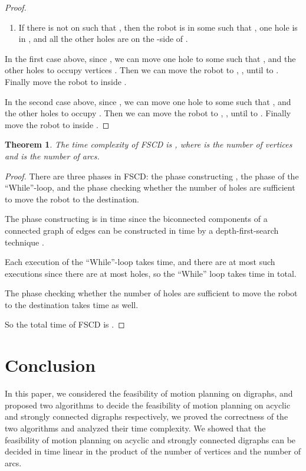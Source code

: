 \documentclass{article}
\newtheorem{thm}{Theorem}
\begin{document}
\begin{proof}
\begin{enumerate}
\item If there is  not on  such that
, then the robot is in some  such that
, one hole is in , and all
the other holes are on the -side of .
\end{enumerate}

In the first case above, since , we can move one hole
to some  such that , and the other holes to
occupy vertices . Then we can move the robot
to , , until to . Finally move the robot to
 inside .

In the second case above, since , we can move one
hole to some  such that , and the other
holes to occupy . Then we can move the robot to
, , until to . Finally move the robot to 
inside .

\end{proof}

\begin{thm}\label{thm:strong-complexity}
The time complexity of FSCD is , where  is the number of
vertices and  is the number of arcs.
\end{thm}
\begin{proof}

There are three phases in FSCD: the phase constructing
, the phase of the ``While''-loop, and the
phase checking whether the number of holes are sufficient to move
the robot to the destination.

The phase constructing  is in time 
since the biconnected components of a connected graph of  edges
can be constructed in  time by a depth-first-search technique
\cite{CLRS01}.

Each execution of the ``While''-loop takes  time, and there
are at most  such executions since there are at most  holes,
so the ``While'' loop takes  time in total.

The phase checking whether the number of holes are sufficient to
move the robot to the destination takes  time as well.

So the total time of FSCD is .
\end{proof}


\section{Conclusion}

In this paper, we considered the feasibility of motion planning on
digraphs, and proposed two algorithms to decide the feasibility of
motion planning on acyclic and strongly connected digraphs
respectively, we proved the correctness of the two algorithms and
analyzed their time complexity. We showed that the feasibility of
motion planning on acyclic and strongly connected digraphs can be
decided in time linear in the product of the number of vertices and
the number of arcs.
\end{document}
